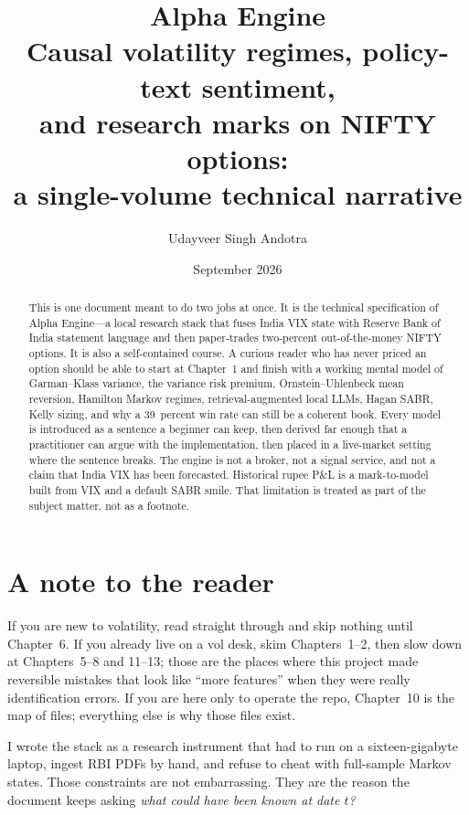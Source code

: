 \documentclass[11pt,a4paper]{article}
\title{\textbf{Alpha Engine}\\[0.55em]
\large Causal volatility regimes, policy-text sentiment,\\
and research marks on NIFTY options:\\[0.25em]
a single-volume technical narrative}
\author{Udayveer Singh Andotra}
\date{September 2026}
\begin{document}
\maketitle

\begin{abstract}
This is one document meant to do two jobs at once. It is the technical specification of Alpha Engine---a local research stack that fuses India VIX state with Reserve Bank of India statement language and then paper-trades two-percent out-of-the-money NIFTY options. It is also a self-contained course. A curious reader who has never priced an option should be able to start at Chapter~1 and finish with a working mental model of Garman--Klass variance, the variance risk premium, Ornstein--Uhlenbeck mean reversion, Hamilton Markov regimes, retrieval-augmented local LLMs, Hagan SABR, Kelly sizing, and why a 39~percent win rate can still be a coherent book. Every model is introduced as a sentence a beginner can keep, then derived far enough that a practitioner can argue with the implementation, then placed in a live-market setting where the sentence breaks. The engine is not a broker, not a signal service, and not a claim that India VIX has been forecasted. Historical rupee P\&L is a mark-to-model built from VIX and a default SABR smile. That limitation is treated as part of the subject matter, not as a footnote.
\end{abstract}

\tableofcontents
\newpage

\section*{A note to the reader}

If you are new to volatility, read straight through and skip nothing until Chapter~6. If you already live on a vol desk, skim Chapters~1--2, then slow down at Chapters~5--8 and 11--13; those are the places where this project made reversible mistakes that look like ``more features'' when they were really identification errors. If you are here only to operate the repo, Chapter~10 is the map of files; everything else is why those files exist.

I wrote the stack as a research instrument that had to run on a sixteen-gigabyte laptop, ingest RBI PDFs by hand, and refuse to cheat with full-sample Markov states. Those constraints are not embarrassing. They are the reason the document keeps asking \emph{what could have been known at date $t$?}
\end{document}
